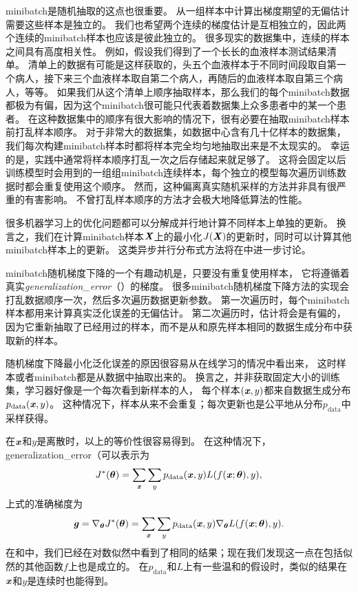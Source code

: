 \gls{minibatch}是随机抽取的这点也很重要。
从一组样本中计算出梯度期望的无偏估计需要这些样本是独立的。
我们也希望两个连续的梯度估计是互相独立的，因此两个连续的\gls{minibatch}样本也应该是彼此独立的。
很多现实的数据集中，连续的样本之间具有高度相关性。
例如，假设我们得到了一个长长的血液样本测试结果清单。
清单上的数据有可能是这样获取的，头五个血液样本于不同时间段取自第一个病人，接下来三个血液样本取自第二个病人，再随后的血液样本取自第三个病人，等等。
如果我们从这个清单上顺序抽取样本，那么我们的每个\gls{minibatch}数据都极为有偏，因为这个\gls{minibatch}很可能只代表着数据集上众多患者中的某一个患者。
在这种数据集中的顺序有很大影响的情况下，很有必要在抽取\gls{minibatch}样本前打乱样本顺序。
对于非常大的数据集，如数据中心含有几十亿样本的数据集，我们每次构建\gls{minibatch}样本时都将样本完全均匀地抽取出来是不太现实的。
幸运的是，实践中通常将样本顺序打乱一次之后存储起来就足够了。
这将会固定以后训练模型时会用到的一组组\gls{minibatch}连续样本，每个独立的模型每次遍历训练数据时都会重复使用这个顺序。
然而，这种偏离真实随机采样的方法并非具有很严重的有害影响。
不曾打乱样本顺序的方法才会极大地降低算法的性能。

很多机器学习上的优化问题都可以分解成并行地计算不同样本上单独的更新。
换言之，我们在计算\gls{minibatch}样本$\boldsymbol{\mathit{X}}$上的最小化$J(\boldsymbol{\mathit{X}})$的更新时，同时可以计算其他\gls{minibatch}样本上的更新。
这类异步并行分布式方法将在中进一步讨论。

\gls{minibatch}随机梯度下降的一个有趣动机是，只要没有重复使用样本，
它将遵循着真实\emph{\gls{generalization_error}}（）的梯度。
很多\gls{minibatch}随机梯度下降方法的实现会打乱数据顺序一次，然后多次遍历数据更新参数。
第一次遍历时，每个\gls{minibatch}样本都用来计算真实泛化误差的无偏估计。
第二次遍历时，估计将会是有偏的，因为它重新抽取了已经用过的样本，而不是从和原先样本相同的数据生成分布中获取新的样本。


随机梯度下降最小化泛化误差的原因很容易从在线学习的情况中看出来，
这时样本或者\gls{minibatch}都是从数据中抽取出来的。
换言之，并非获取固定大小的训练集，学习器好像是一个每次看到新样本的人，
每个样本$(\boldsymbol{\mathit{x}},y)$都来自数据生成分布$p_{\text{data}}(\boldsymbol{\mathit{x}},y)$。
这种情况下，样本从来不会重复；每次更新也是公平地从分布$p_\text{data}$中采样获得。

在$\boldsymbol{\mathit{x}}$和$y$是离散时，以上的等价性很容易得到。
在这种情况下，\gls{generalization_error}（可以表示为
\begin{equation}
\label{eq:8.7}
    J^*(\boldsymbol{\theta}) = \sum_{\boldsymbol{\mathit{x}}} \sum_y p_{\text{data}}(\boldsymbol{\mathit{x}}, y) L(f(\boldsymbol{\mathit{x}}; \boldsymbol{\theta}),y),
\end{equation}
上式的准确梯度为
\begin{equation}
\label{eq:8.8}
    \boldsymbol{\mathit{g}} = \nabla_{\boldsymbol{\theta}} J^*(\boldsymbol{\theta}) = \sum_{\boldsymbol{\mathit{x}}} \sum_y p_{\text{data}}
    (\boldsymbol{\mathit{x}}, y) \nabla_{\boldsymbol{\theta}} L(f(\boldsymbol{\mathit{x}};\boldsymbol{\theta}),y) .
\end{equation}
在和中，我们已经在对数似然中看到了相同的结果；现在我们发现这一点在包括似然的其他函数$f$上也是成立的。
在$p_\text{data}$和$L$上有一些温和的假设时，类似的结果在$\boldsymbol{\mathit{x}}$和$y$是连续时也能得到。

